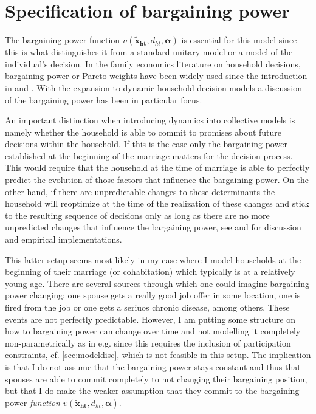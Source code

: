 
\section{Specification of bargaining power}
The bargaining power function $\upsilon(\boldsymbol{\tilde{x}_{ht}},d_{ht},\boldsymbol{\alpha})$ is essential for this model since this is what distinguishes it from a standard unitary model or a model of the individual's decision. In the family economics literature on household decisions, bargaining power or Pareto weights have been widely used since the introduction in \cite{ManserBrown1980} and \cite{McElroyetal1981}. With the expansion to dynamic household decision models a discussion of the bargaining power has been in particular focus. 

An important distinction when introducing dynamics into collective models is namely whether the household is able to commit to promises about future decisions within the household. If this is the case only the bargaining power established at the beginning of the marriage matters for the decision process. This would require that the household at the time of marriage is able to perfectly predict the evolution of those factors that influence the bargaining power. On the other hand, if there are unpredictable changes to these determinants the household will reoptimize at the time of the realization of these changes and stick to the resulting sequence of decisions only as long as there are no more unpredicted changes that influence the bargaining power, see \cite{LundbergPollak2003,Ligon2011,Theloudis2016} and \cite{Mazzocco2007} for discussion and empirical implementations. 

This latter setup seems most likely in my case where I model households at the beginning of their marriage (or cohabitation) which typically is at a relatively young age. There are several sources through which one could imagine bargaining power changing: one spouse gets a really good job offer in some location, one is fired from the job or one gets a seriuos chronic disease, among others. These events are not perfectly predictable. However, I am putting some structure on how to bargaining power can change over time and not modelling it completely non-parametrically as in e.g. \cite{Voena2015} since this requires the inclusion of participation constraints, cf. \autoref{sec:modeldisc}, which is not feasible in this setup. The implication is that I do not assume that the bargaining power stays constant and thus that spouses are able to commit completely to not changing their bargaining position, but that I do make the weaker assumption that they commit to the bargaining power \textit{function} $\upsilon(\boldsymbol{\tilde{x}_{ht}},d_{ht},\boldsymbol{\alpha})$. 

